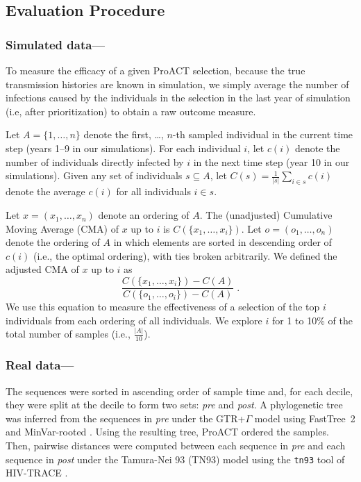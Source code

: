 \documentclass[a4paper,10pt]{article}
\begin{document}
\subsection{Evaluation Procedure}

\subsubsection{Simulated data---}
To measure the efficacy of a given ProACT selection,
because the true transmission histories are known in simulation,
we simply average the number of infections caused by the individuals in the selection in the last year of simulation (i.e, after prioritization)
to obtain a raw outcome measure.

Let $A=\{1,\ldots,n\}$ denote the first, \ldots, $n$-th sampled individual in the current time step (years 1--9 in our simulations). For each individual $i$, let $c(i)$ denote the number of individuals directly infected by $i$ in the next time step (year 10 in our simulations). 
Given any set of individuals $s\subseteq A$, let $C(s)=\frac{1}{|s|}\sum_{i\in s}{c(i)}$ denote the average $c(i)$ for all individuals $i\in s$.

Let $x=(x_1,\ldots,x_n)$ denote an ordering of $A$. The (unadjusted) Cumulative Moving Average (CMA) of $x$ up to $i$ is $C\left(\{x_1,\ldots,x_i\}\right)$.
Let $o=(o_1,\ldots,o_n)$ denote the ordering of $A$ in which elements are sorted in descending order of $c(i)$ (i.e., the optimal ordering), with ties broken arbitrarily. 
We defined the adjusted CMA of $x$ up to $i$ as
\begin{equation*}%
    \frac{C\left(\{x_1,\ldots,x_i\}\right)-C(A)}{C\left(\{o_1,\ldots,o_i\}\right)-C(A)}\; .
\end{equation*}
We use this equation to measure the effectiveness of a selection of the top $i$ individuals from each ordering of all individuals.
We explore $i$ for 1 to 10\% of the total number of samples (i.e., $\frac{|A|}{10}$). 

\subsubsection{Real data---}
The sequences were sorted in ascending order of sample time and,
for each decile,
they were split at the decile to form two sets: \textit{pre} and \textit{post}. A phylogenetic tree was inferred from the sequences in \textit{pre} under the GTR+$\Gamma$ model using FastTree~2 \supercite{Price2010} and MinVar-rooted \supercite{Mai2017}.
Using the resulting tree, ProACT ordered the samples. 
Then, pairwise distances were computed between each sequence in \textit{pre} and each sequence in \textit{post} under the Tamura-Nei 93 (TN93) model \supercite{Tamura1993} using the \texttt{tn93} tool of HIV-TRACE \supercite{Pond2018}.
\end{document}
